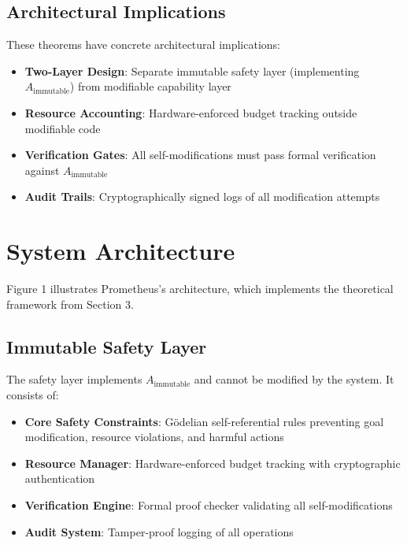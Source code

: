 \documentclass[11pt,letterpaper]{article}
\begin{document}
\subsection{Architectural Implications}

These theorems have concrete architectural implications:

\begin{itemize}
\item \textbf{Two-Layer Design}: Separate immutable safety layer (implementing $A_{\text{immutable}}$) from modifiable capability layer
\item \textbf{Resource Accounting}: Hardware-enforced budget tracking outside modifiable code
\item \textbf{Verification Gates}: All self-modifications must pass formal verification against $A_{\text{immutable}}$
\item \textbf{Audit Trails}: Cryptographically signed logs of all modification attempts
\end{itemize}

\section{System Architecture}

Figure 1 illustrates Prometheus's architecture, which implements the theoretical framework from Section 3.

\subsection{Immutable Safety Layer}

The safety layer implements $A_{\text{immutable}}$ and cannot be modified by the system. It consists of:

\begin{itemize}
\item \textbf{Core Safety Constraints}: Gödelian self-referential rules preventing goal modification, resource violations, and harmful actions
\item \textbf{Resource Manager}: Hardware-enforced budget tracking with cryptographic authentication
\item \textbf{Verification Engine}: Formal proof checker validating all self-modifications
\item \textbf{Audit System}: Tamper-proof logging of all operations
\end{itemize}
\end{document}
